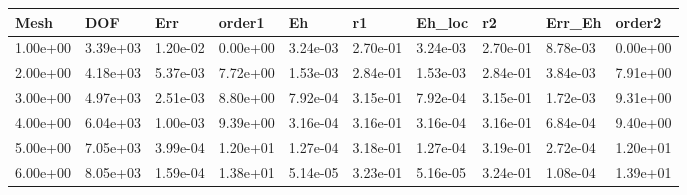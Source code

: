 \begin{tabular}{llllllllll}
Mesh & DOF & Err & order1 & Eh & r1 & Eh_loc & r2 & Err_Eh & order2 \\ 
\hline 
1.00e+00 & 3.39e+03 & 1.20e-02 & 0.00e+00 & 3.24e-03 & 2.70e-01 & 3.24e-03 & 2.70e-01 & 8.78e-03 & 0.00e+00 \\ 
2.00e+00 & 4.18e+03 & 5.37e-03 & 7.72e+00 & 1.53e-03 & 2.84e-01 & 1.53e-03 & 2.84e-01 & 3.84e-03 & 7.91e+00 \\ 
3.00e+00 & 4.97e+03 & 2.51e-03 & 8.80e+00 & 7.92e-04 & 3.15e-01 & 7.92e-04 & 3.15e-01 & 1.72e-03 & 9.31e+00 \\ 
4.00e+00 & 6.04e+03 & 1.00e-03 & 9.39e+00 & 3.16e-04 & 3.16e-01 & 3.16e-04 & 3.16e-01 & 6.84e-04 & 9.40e+00 \\ 
5.00e+00 & 7.05e+03 & 3.99e-04 & 1.20e+01 & 1.27e-04 & 3.18e-01 & 1.27e-04 & 3.19e-01 & 2.72e-04 & 1.20e+01 \\ 
6.00e+00 & 8.05e+03 & 1.59e-04 & 1.38e+01 & 5.14e-05 & 3.23e-01 & 5.16e-05 & 3.24e-01 & 1.08e-04 & 1.39e+01 \\ 
\hline 
\end{tabular}